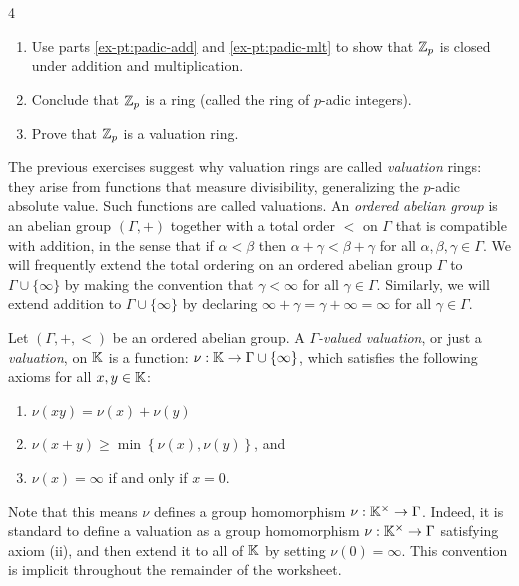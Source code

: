 \documentclass[Notebook.tex]{subfiles}
\begin{document}
\begin{problem}{4}
\begin{enumerate}[label=(\alph*),ref=\theenumi\alph*]
            \item Use parts \ref{ex-pt:padic-add} and \ref{ex-pt:padic-mlt} to show that $\mathbb Z_p$ is closed under addition and multiplication.
            
            \item Conclude that $\mathbb Z_p$ is a ring (called the ring of $p$-adic integers).
            
            \item Prove that $\mathbb Z_{p}$ is a valuation ring. 
        \end{enumerate}

    \end{problem}

    \hrulefill

    The previous exercises suggest why valuation rings are called \emph{valuation} rings: they arise from functions that measure divisibility, generalizing the $p$-adic absolute value. Such functions are called valuations. An \emph{ordered abelian group} is an abelian group $(\Gamma,+)$ together with a total order $<$ on $\Gamma$ that is compatible with addition, in the sense that if $\alpha<\beta$ then  $\alpha+\gamma<\beta+\gamma$ for all $\alpha,\beta,\gamma \in \Gamma$.   We will frequently extend the total ordering on an ordered abelian group $\Gamma$ to $\Gamma \cup \{\infty\}$ by making the convention that $\gamma < \infty$ for all $\gamma \in \Gamma$. Similarly, we will extend addition to $\Gamma\cup\{\infty\}$ by declaring $\infty + \gamma = \gamma + \infty = \infty$ for all $\gamma \in \Gamma$.

    \begin{definition}
    Let $(\Gamma,+,<)$ be an ordered abelian group. A  \emph{$\Gamma$-valued valuation}, or just a \emph{valuation}, on $\mathbb K$ is a function: $\nu:\mathbb K \to \Gamma\cup\{\infty\}$, which satisfies the following axioms for all $x,y\in \mathbb K$:
    \begin{enumerate}
    \item $\nu(xy) = \nu(x) + \nu(y)$
    \item $\nu(x + y) \geq \min\left\{ \nu(x), \nu(y)\right\}$, and
    \item $\nu(x) = \infty$ if and only if $x=0$.
    \end{enumerate}
    \end{definition}

    Note that this means $\nu$ defines a group homomorphism $\nu:\mathbb K^{\times} \to \Gamma$. Indeed, it is standard to define a valuation as a group homomorphism $\nu: \mathbb K^{\times} \to \Gamma$ satisfying axiom (ii), and then extend it to all of $\mathbb K$ by setting $\nu(0)=\infty$. This convention is implicit throughout the remainder of the worksheet. 
\end{document}
